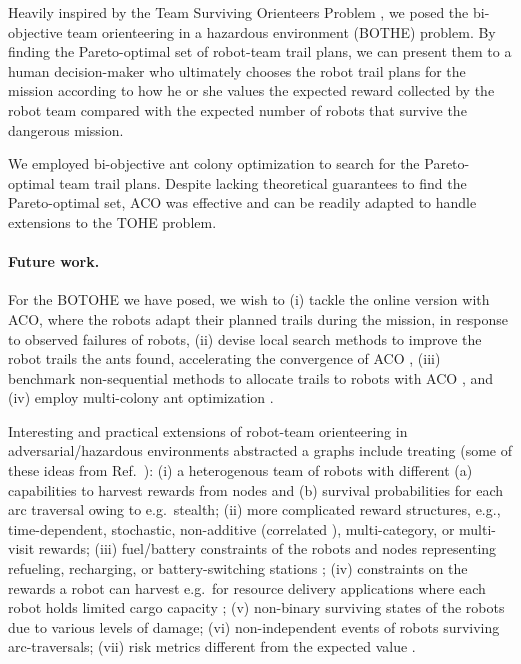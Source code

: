 \documentclass[11pt, oneside]{article}
\begin{document}
Heavily inspired by the Team Surviving Orienteers Problem \cite{jorgensen2018team,jorgensen2017matroid,jorgensen2024matroid}, we posed the bi-objective team orienteering in a hazardous environment (BOTHE) problem. 
By finding the Pareto-optimal set of robot-team trail plans, we can present them to a human decision-maker who ultimately chooses the robot trail plans for the mission according to how he or she values the expected reward collected by the robot team compared with the expected number of robots that survive the dangerous mission.

We employed bi-objective ant colony optimization to search for the Pareto-optimal team trail plans. Despite lacking theoretical guarantees to find the Pareto-optimal set, ACO was effective and can be readily adapted to handle extensions to the TOHE problem.

\paragraph{Future work.}
For the BOTOHE we have posed, we wish to (i) tackle the online version with ACO, where the robots adapt their planned trails during the mission, in response to observed failures of robots, (ii) devise local search methods to improve the robot trails the ants found, accelerating the convergence of ACO \cite{dorigo2006ant}, (iii) benchmark non-sequential methods to allocate trails to robots with ACO \cite{ke2008ants}, and (iv) employ multi-colony ant optimization \cite{iredi2001bi}.

Interesting and practical extensions of robot-team orienteering in adversarial/hazardous environments abstracted a graphs include treating (some of these ideas from Ref.~\cite{jorgensen2018team}): 
(i) a heterogenous team of robots with different (a) capabilities to harvest rewards from nodes and (b) survival probabilities for each arc traversal owing to e.g.\ stealth;
(ii) more complicated reward structures, e.g., time-dependent, stochastic, non-additive (correlated \cite{yu2014correlated}), multi-category, or multi-visit rewards;
(iii) fuel/battery constraints of the robots and nodes representing refueling, recharging, or battery-switching stations \cite{asghar2023risk,khuller2011fill,liao2016electric,yu2019coverage}; 
(iv) constraints on the rewards a robot can harvest e.g.\ for resource delivery applications where each robot holds limited cargo capacity \cite{coelho2014thirty};
(v) non-binary surviving states of the robots due to various levels of damage;
(vi) non-independent events of robots surviving arc-traversals;
(vii) risk metrics different from the expected value \cite{majumdar2020should}.
\end{document}

